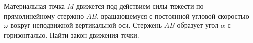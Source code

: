 Материальная точка $M$ движется под действием силы тяжести
по прямолинейному стержню $AB$,
вращающемуся с постоянной угловой скоростью $\omega$
вокруг неподвижной вертикальной оси.
Стержень $AB$ образует угол $\alpha$ с горизонталью.
Найти закон движения точки.
